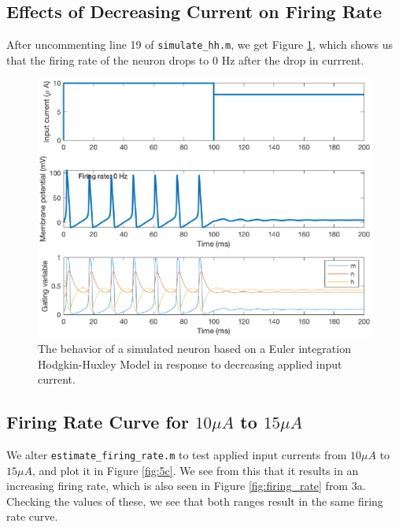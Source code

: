 \documentclass[11pt, oneside]{article}
\begin{document}
\subsection{Effects of Decreasing Current on Firing Rate}

After uncommenting line 19 of \lstinline{simulate_hh.m}, we get Figure \ref{fig:decrease_stim}, which shows us that the firing rate of the neuron drops to 0 Hz after the drop in currrent.

\begin{figure}[ht!]
\centering
\includegraphics[width=1\textwidth]{decrease_stim.eps}
\caption{The behavior of a simulated neuron based on a Euler integration Hodgkin-Huxley Model in response to decreasing applied input current.}
\label{fig:decrease_stim}
\end{figure}

\subsection{Firing Rate Curve for $10\mu A$ to $15\mu A$}

We alter \lstinline{estimate_firing_rate.m} to test applied input currents from $10\mu A$ to $15\mu A$, and plot it in Figure \ref{fig:5c}. We see from this that it results in an increasing firing rate, which is also seen in Figure \ref{fig:firing_rate} from 3a. Checking the values of these, we see that both ranges result in the same firing rate curve.
\end{document}
